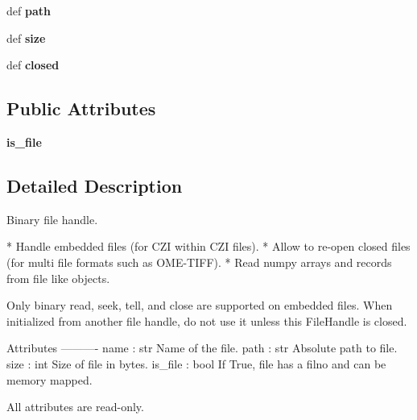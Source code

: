 \begin{DoxyCompactItemize}
\item 
\hypertarget{classtifffile_1_1FileHandle_a23b95cb72e478e26496e6d3d7527a3a3}{def {\bfseries path}}\label{classtifffile_1_1FileHandle_a23b95cb72e478e26496e6d3d7527a3a3}

\item 
\hypertarget{classtifffile_1_1FileHandle_a8fc096aaf40c918ccfc6f61304c63384}{def {\bfseries size}}\label{classtifffile_1_1FileHandle_a8fc096aaf40c918ccfc6f61304c63384}

\item 
\hypertarget{classtifffile_1_1FileHandle_ac35c2f69232e3c539f7b5859db1239c4}{def {\bfseries closed}}\label{classtifffile_1_1FileHandle_ac35c2f69232e3c539f7b5859db1239c4}

\end{DoxyCompactItemize}
\subsection*{Public Attributes}
\begin{DoxyCompactItemize}
\item 
\hypertarget{classtifffile_1_1FileHandle_a965cb7fae14d9f259b2197072da2cf2e}{{\bfseries is\-\_\-file}}\label{classtifffile_1_1FileHandle_a965cb7fae14d9f259b2197072da2cf2e}

\end{DoxyCompactItemize}


\subsection{Detailed Description}
\begin{DoxyVerb}Binary file handle.

* Handle embedded files (for CZI within CZI files).
* Allow to re-open closed files (for multi file formats such as OME-TIFF).
* Read numpy arrays and records from file like objects.

Only binary read, seek, tell, and close are supported on embedded files.
When initialized from another file handle, do not use it unless this
FileHandle is closed.

Attributes
----------
name : str
    Name of the file.
path : str
    Absolute path to file.
size : int
    Size of file in bytes.
is_file : bool
    If True, file has a filno and can be memory mapped.

All attributes are read-only.\end{DoxyVerb}
 

